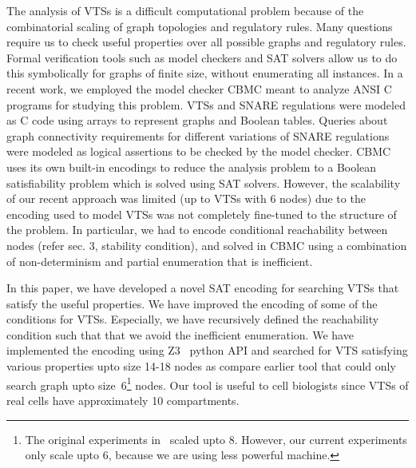 The analysis of VTSs is a difficult computational problem because of the combinatorial scaling of graph topologies and regulatory rules. Many questions require us to check useful properties over all possible graphs and regulatory rules. Formal verification tools such as model checkers \cite{clarke1996symbolic, biere2003bounded, clarke2008birth, cimatti2000nusmv, holzmann1997model} and SAT solvers \cite{moskewicz2001chaff,een2004extensible} allow us to do this symbolically for graphs of finite size, without enumerating all instances. In a recent work, we employed the model checker CBMC \cite{CKY03, ckl2004} meant to analyze ANSI C programs for studying this problem. VTSs and SNARE regulations were modeled as C code using arrays to represent graphs and Boolean tables. Queries about graph connectivity requirements for different variations of SNARE regulations were modeled as logical assertions to be checked by the model checker. CBMC uses its own built-in encodings to reduce the analysis problem to a Boolean satisfiability problem which is solved using SAT solvers.
%
However, the scalability of our recent approach was limited (up to
VTSs with 6 nodes) due to the encoding used to model VTSs was not completely
fine-tuned to the structure of the problem.
%
In particular, we had to encode conditional reachability between
nodes (refer sec. 3, stability condition), and solved in CBMC using a
combination of non-determinism and partial enumeration that is
inefficient.



In this paper, we have developed a novel SAT encoding for
searching VTSs that satisfy the useful properties.
%
We have improved the encoding of some of the conditions for VTSs.
%
Especially, we have recursively defined the reachability condition
such that that we avoid the inefficient enumeration.
%
%
%
We have implemented the encoding using Z3~\cite{z3} python API and
searched for VTS satisfying various properties upto size 14-18 nodes
as compare earlier tool that could only search graph upto
size~6\footnote{The original experiments in~\cite{shukla} scaled upto 8.
However, our current experiments only scale upto 6, because
we are using less powerful machine.} nodes.
%
Our tool is useful to cell biologists since VTSs of real cells have
approximately 10 compartments.

